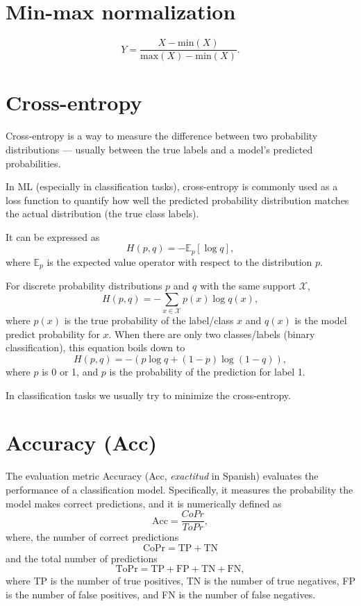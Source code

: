 \section{Min-max normalization}
\begin{equation}
  Y = \frac{X-\text{min}(X)}{\text{max}(X)-\text{min}(X)}.
\end{equation}

\section{Cross-entropy}
Cross-entropy is a way to measure the difference between two probability distributions — usually between the true labels and a model’s predicted probabilities.

In ML (especially in classification tasks), cross-entropy is commonly used as a loss function to quantify how well the predicted probability distribution matches the actual distribution (the true class labels).

It can be expressed as
\begin{equation}
  H(p,q) = -\mathbb{E}_p[\log q],
\end{equation}
where $\mathbb{E}_p$ is the expected value operator with respect to
the distribution $p$.

For discrete probability distributions $p$ and $q$ with the same support $\mathcal{X}$,
\begin{equation}
  H(p,q) = -\sum_{x\in\mathcal{X}}p(x)\log q(x),
\end{equation}
where $p(x)$ is the true probability of the label/class $x$ and $q(x)$ is the model predict probability for $x$. When there are only two classes/labels (binary classification), this equation boils down to
\begin{equation}
  H(p,q) = -(p\log q + (1-p)\log(1-q)),
\end{equation}
where $p$ is 0 or 1, and $p$ is the probability of the prediction for label 1.

In classification tasks we usually try to minimize the cross-entropy.

\section{Accuracy (Acc)}
The evaluation metric Accuracy (Acc, \emph{exactitud} in Spanish) evaluates the performance of a
classification model. Specifically, it measures the probability the model
makes correct predictions, and it is numerically defined as
\begin{equation}
  \text{Acc} = \frac{CoPr}{ToPr},
\end{equation}
where, the number of correct predictions
\begin{equation}
  \text{CoPr} = \text{TP} + \text{TN}
\end{equation}
and the total number of predictions
\begin{equation}
  \text{ToPr} = \text{TP} + \text{FP} + \text{TN} + \text{FN},
\end{equation}
where TP is the number of true positives, TN is the number of true
negatives, FP is the number of false positives, and FN is the number
of false negatives.

